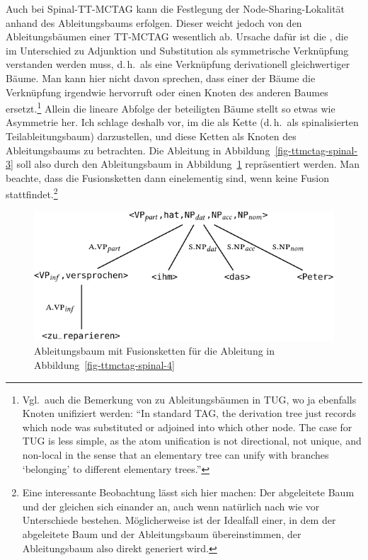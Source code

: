 Auch bei Spinal-TT-MCTAG kann die Festlegung der Node-Sharing-Loka\-li\-tät anhand des Ableitungsbaums erfolgen. Dieser weicht jedoch von den Ableitungsbäumen einer TT-MC\-TAG wesentlich ab. Ursache dafür ist die , die im Unterschied zu Adjunktion und Substitution als symmetrische Verknüpfung verstanden werden muss, d.\,h.\ als eine Verknüpfung derivationell gleichwertiger Bäume. Man kann hier nicht davon sprechen, dass einer der Bäume die Verknüpfung irgendwie hervorruft oder einen Knoten des anderen Baumes ersetzt.\footnote{Vgl.\ auch die Bemerkung von \citet[21]{Gerdes:04} zu Ableitungsbäumen in TUG, wo ja ebenfalls Knoten unifiziert werden: "`In  standard TAG, the derivation tree just records which node was substituted or adjoined into which other node. The case for TUG is less simple, as the atom unification is not directional, not unique, and non-local in the sense that an elementary tree can unify with branches `belonging' to different elementary trees."' } Allein die lineare Abfolge der beteiligten Bäume stellt so etwas wie Asymmetrie her. Ich schlage deshalb vor, im  die  als Kette (d.\,h.\ als spinalisierten Teilableitungsbaum) darzustellen, und diese Ketten als Knoten des Ableitungsbaums zu betrachten. Die Ableitung in Abbildung~\ref{fig-ttmctag-spinal-3} soll also durch den Ableitungsbaum in Abbildung~\ref{fig-ttmctag-spinal-5} repräsentiert werden. Man beachte, dass die Fusionsketten dann einelementig sind, wenn keine Fusion stattfindet.\footnote{Eine interessante Beobachtung lässt sich hier machen: Der abgeleitete Baum und der  gleichen sich einander an, auch wenn natürlich nach wie vor Unterschiede bestehen. Möglicherweise ist der Idealfall einer, in dem der abgeleitete Baum und der Ableitungsbaum übereinstimmen, der Ableitungsbaum also direkt generiert wird.} 
\begin{figure}[t]
\centering
\includegraphics{graphics/abb748.pdf}
\caption{\label{fig-ttmctag-spinal-5}Ableitungsbaum mit Fusionsketten für die Ableitung in Abbildung~\ref{fig-ttmctag-spinal-4}}
\end{figure}


